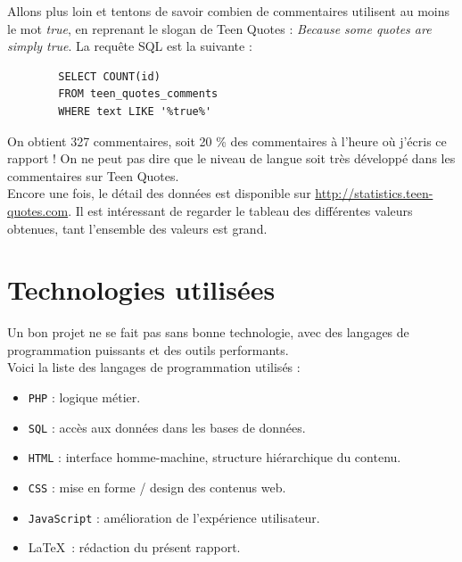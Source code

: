 \documentclass{report}
\begin{document}
	Allons plus loin et tentons de savoir combien de commentaires utilisent au moins le mot \textit{true}, en reprenant le slogan de Teen Quotes : \textit{Because some quotes are simply true}. La requête SQL est la suivante :
	\begin{lstlisting}
		SELECT COUNT(id) 
		FROM teen_quotes_comments
		WHERE text LIKE '%true%'
	\end{lstlisting}
	On obtient 327 commentaires, soit 20 \% des commentaires à l'heure où j'écris ce rapport ! On ne peut pas dire que le niveau de langue soit très développé dans les commentaires sur Teen Quotes.\\
		
	Encore une fois, le détail des données est disponible sur \url{http://statistics.teen-quotes.com}. Il est intéressant de regarder le tableau des différentes valeurs obtenues, tant l'ensemble des valeurs est grand.
	
	\chapter{Technologies utilisées}
	Un bon projet ne se fait pas sans bonne technologie, avec des langages de programmation puissants et des outils performants.\\

	Voici la liste des langages de programmation utilisés :
	\vspace{10px}
	\begin{itemize}
		\item \texttt{PHP} : logique métier.
		\item \texttt{SQL} : accès aux données dans les bases de données.
		\item \texttt{HTML} : interface homme-machine, structure hiérarchique du contenu.
		\item \texttt{CSS} : mise en forme / design des contenus web.
		\item \texttt{JavaScript} : amélioration de l'expérience utilisateur.
		\item \LaTeX\ : rédaction du présent rapport.
	\end{itemize}
	\vspace{10px}
\end{document}
